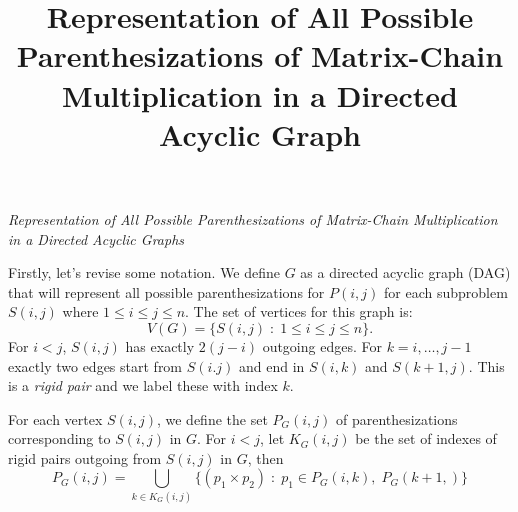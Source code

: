 \documentclass[12pt, a4paper]{article}
\title{\Large Representation of All Possible Parenthesizations of Matrix-Chain Multiplication in a Directed
Acyclic Graph}
\date{}
\author{}
\theoremstyle{remark}
\begin{document}
    \textit{\large Representation of All Possible Parenthesizations of Matrix-Chain Multiplication in a Directed
    Acyclic Graphs} 

    Firstly, let's revise some notation. We define $G$ as a directed acyclic graph (DAG) that will 
    represent all possible parenthesizations for $P(i,j)$ for each subproblem $S(i,j)$ where 
    $ 1 \leq i \leq j \leq n$. The set of vertices for this graph is:
    \[V(G) = \{S(i,j)\; : \; 1 \leq i \leq j \leq n \}.\]
    For $i < j$, $S(i,j)$ has exactly $2(j-i)$ outgoing edges. For $k = i, \dots, j-1$ exactly two edges 
    start from $S(i.j)$ and end in $S(i, k)$ and $S(k+1, j)$. This is a \emph{rigid pair} 
    and we label these with index $k$. 

    For each vertex $S(i,j)$, we define the set $P_G(i,j)$ of parenthesizations corresponding to $S(i,j)$ in $G$. 
    For $i < j$, let $K_G(i,j)$ be the set of indexes of rigid pairs outgoing from $S(i,j)$ in $G$, then
    \[P_G(i,j) = \bigcup_{k \in K_G(i,j)} \{(p_1 \times p_2) \; : \; p_1 \in P_G(i,k), \; P_G(k+1, )\} \]    
    
\end{document}
